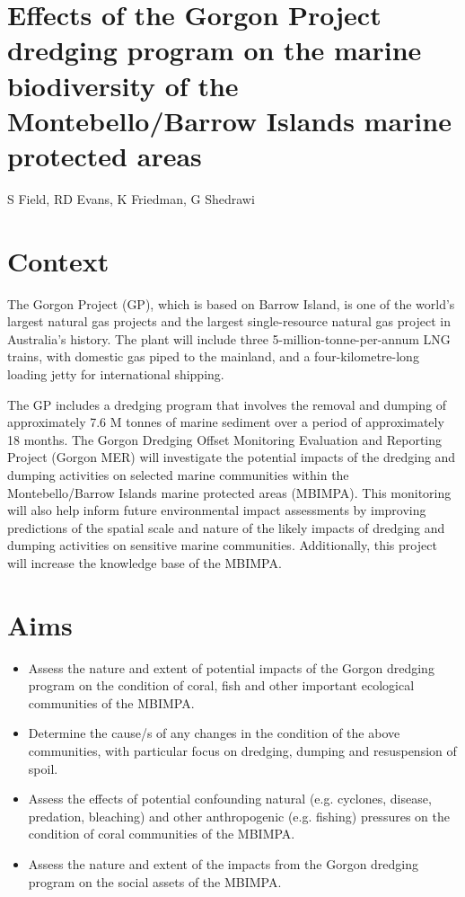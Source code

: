 \documentclass[version=last,
    paper=a4, %
    10pt, %
    usenames,
    dvipsnames,
    oneside, %
    headings=openany, %
    DIV=15 %
]{scrbook}
\begin{document}
\section*{Effects of the Gorgon Project dredging program on the marine
biodiversity of the Montebello/Barrow Islands marine protected areas
}

S Field, RD Evans, K Friedman, G Shedrawi


\section*{Context}
The Gorgon Project (GP), which is based on Barrow Island, is one of the
world's largest natural gas projects and the largest single-resource
natural gas project in Australia's history. The plant will include three
5-million-tonne-per-annum LNG trains, with domestic gas piped to the
mainland, and a four-kilometre-long loading jetty for international
shipping.

The GP includes a dredging program that involves the removal and dumping
of approximately 7.6 M tonnes of marine sediment over a period of
approximately 18 months. The Gorgon Dredging Offset Monitoring
Evaluation and Reporting Project (Gorgon MER) will investigate the
potential impacts of the dredging and dumping activities on selected
marine communities within the Montebello/Barrow Islands marine protected
areas (MBIMPA). This monitoring will also help inform future
environmental impact assessments by improving predictions of the spatial
scale and nature of the likely impacts of dredging and dumping
activities on sensitive marine communities. Additionally, this project
will increase the knowledge base of the MBIMPA.



\section*{Aims}
\begin{itemize}
\itemsep1pt\parskip0pt
\item
  Assess the nature and extent of potential impacts of the Gorgon
  dredging program on the condition of coral, fish and other important
  ecological communities of the MBIMPA.
\item
  Determine the cause/s of any changes in the condition of the above
  communities, with particular focus on dredging, dumping and
  resuspension of spoil.
\item
  Assess the effects of potential confounding natural (e.g. cyclones,
  disease, predation, bleaching) and other anthropogenic (e.g. fishing)
  pressures on the condition of coral communities of the MBIMPA.
\item
  Assess the nature and extent of the impacts from the Gorgon dredging
  program on the social assets of the MBIMPA.
\end{itemize}
\end{document}
